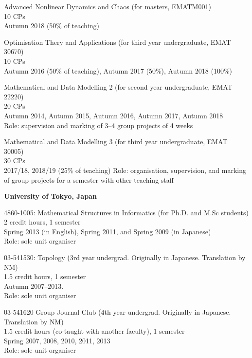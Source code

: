 \documentclass[11pt,letter]{article}
\renewenvironment{itemize}{
  \begin{list}{}{
    \setlength{\leftmargin}{1.5em}
    \setlength{\itemsep}{0.25em}
    \setlength{\parskip}{0pt}
    \setlength{\parsep}{0.25em}
  }
}{
  \end{list}
}
\begin{document}
\begin{itemize}
\item Advanced Nonlinear Dynamics and Chaos (for masters, EMATM001)\\
10 CPs\\
Autumn 2018 (50\% of teaching) %

\item Optimisation Thery and Applications (for third year undergraduate, EMAT 30670)\\
10 CPs\\
Autumn 2016 (50\% of teaching), Autumn 2017 (50\%), Autumn 2018 (100\%) %

\item Mathematical and Data Modelling 2 (for second year undergraduate, EMAT 22220)\\
20 CPs\\
Autumn 2014, Autumn 2015, Autumn 2016, Autumn 2017, Autumn 2018\\
Role: supervision and marking of 3--4 group projects of 4 weeks

\item Mathematical and Data Modelling 3 (for third year undergraduate, EMAT 30005)\\
30 CPs\\
2017/18, 2018/19 (25\% of teaching) %
Role: organisation, supervision, and marking of group projects for a semester with other teaching staff

\item \textbf{University of Tokyo, Japan}

\item 4860-1005: Mathematical Structures in Informatics (for Ph.D. and M.Sc students)\\
2 credit hours, 1 semester\\
Spring 2013 (in English), Spring 2011, and Spring 2009 (in Japanese)\\
Role: sole unit organiser

\item 03-541530: Topology (3rd year undergrad. Originally in Japanese. Translation by NM)\\
1.5 credit hours, 1 semester\\
Autumn 2007--2013.\\
Role: sole unit organiser

\item 03-541620 Group Journal Club (4th year undergrad. Originally in Japanese. Translation by NM)\\
1.5 credit hours (co-taught with another faculty), 1 semester\\
Spring 2007, 2008, 2010, 2011, 2013\\
Role: sole unit organiser


\end{itemize}
\end{document}
